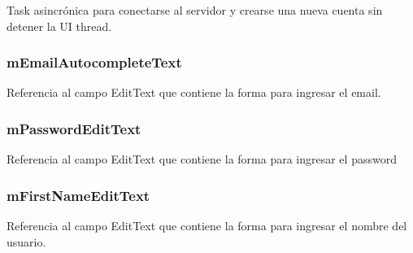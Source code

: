 \documentclass[letterpaper,10pt,english]{sphinxmanual}
\begin{document}
\begin{fulllineitems}
\label{Fragments/SignUpFragment:com.fiuba.tallerii.jobify.SignUpFragment.mSignUpTask}
Task asincrónica para conectarse al servidor y crearse una nueva cuenta sin detener la UI thread.

\end{fulllineitems}



\subsubsection{mEmailAutocompleteText}
\label{Fragments/SignUpFragment:memailautocompletetext}

\begin{fulllineitems}
\label{Fragments/SignUpFragment:com.fiuba.tallerii.jobify.SignUpFragment.mEmailAutocompleteText}
Referencia al campo EditText que contiene la forma para ingresar el email.

\end{fulllineitems}



\subsubsection{mPasswordEditText}
\label{Fragments/SignUpFragment:mpasswordedittext}

\begin{fulllineitems}
\label{Fragments/SignUpFragment:com.fiuba.tallerii.jobify.SignUpFragment.mPasswordEditText}
Referencia al campo EditText que contiene la forma para ingresar el password

\end{fulllineitems}



\subsubsection{mFirstNameEditText}
\label{Fragments/SignUpFragment:mfirstnameedittext}

\begin{fulllineitems}
\label{Fragments/SignUpFragment:com.fiuba.tallerii.jobify.SignUpFragment.mFirstNameEditText}
Referencia al campo EditText que contiene la forma para ingresar el nombre del usuario.

\end{fulllineitems}
\end{document}
